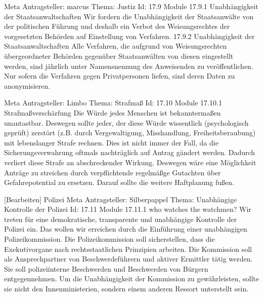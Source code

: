 Meta
Antragsteller: 	marcus
Thema: 	Justiz
Id: 	17.9
Module
17.9.1 Unabhängigkeit der Staatsanwaltschaften 	Wir fordern die Unabhängigkeit der Staatsanwälte von der politischen Führung und deshalb ein Verbot des Weisungsrechtes der vorgesetzten Behörden auf Einstellung von Verfahren.
17.9.2 Unabhängigkeit der Staatsanwaltschaften 	Alle Verfahren, die aufgrund von Weisungsrechten übergeordneter Behörden gegenüber Staatsanwälten von diesen eingestellt werden, sind jährlich unter Namensnennung des Anweisenden zu veröffentlichen. Nur sofern die Verfahren gegen Privatpersonen liefen, sind deren Daten zu anonymisieren.
 
Meta
Antragsteller: 	Limbo
Thema: 	Strafmaß
Id: 	17.10
Module
17.10.1 Strafmaßverschärfung 	Die Würde jedes Menschen ist bekanntermaßen unantastbar. Deswegen sollte jeder, der diese Würde wissentlich (psychologisch geprüft) zerstört (z.B. durch Vergewaltigung, Misshandlung, Freiheitsberaubung) mit lebenslanger Strafe rechnen. Dies ist nicht immer der Fall, da die Sicherungsverwahrung oftmals nachträglich auf Antrag gändert werden. Dadurch verliert diese Strafe an abschreckender Wirkung. Deswegen wäre eine Möglichkeit Anträge zu streichen durch verpflichtende regelmäßge Gutachten über Gefahrepotential zu ersetzen. Darauf sollte die weitere Haftplanung fußen.
 
[Bearbeiten] Polizei
Meta
Antragsteller: 	Silberpappel
Thema: 	Unabhängige Kontrolle der Polizei
Id: 	17.11
Module
17.11.1 who watches the watchmen? 	Wir treten für eine demokratische, transparente und unabhängige Kontrolle der Polizei ein. Das wollen wir erreichen durch die Einführung einer unabhängigen Polizeikommission. Die Polizeikommission soll sicherstellen, dass die Exekutivorgane nach rechtsstaatlichen Prinzipien arbeiten. Die Kommission soll als Ansprechpartner von Beschwerdeführern und aktiver Ermittler tätig werden. Sie soll polizeiinterne Beschwerden und Beschwerden von Bürgern entgegennehmen. Um die Unabhängigkeit der Kommission zu gewährleisten, sollte sie nicht den Innenministerien, sondern einem anderen Ressort unterstellt sein.